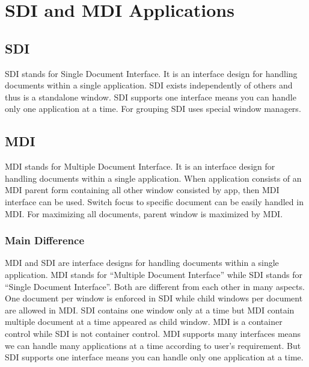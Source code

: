 \section{SDI and MDI Applications}

\subsection{SDI}
SDI stands for Single Document Interface. It is an interface design for handling documents within a
single application. SDI exists independently of others and thus is a standalone window. SDI
supports one interface means you can handle only one application at a time. For grouping SDI uses
special window managers.

\subsection{MDI}
MDI stands for Multiple Document Interface. It is an interface design for handling documents
within a single application. When application consists of an MDI parent form containing all other
window consisted by app, then MDI interface can be used. Switch focus to specific document can
be easily handled in MDI. For maximizing all documents, parent window is maximized by MDI.

\subsubsection*{Main Difference}
MDI and SDI are interface designs for handling documents within a single application. MDI stands
for “Multiple Document Interface” while SDI stands for “Single Document Interface”. Both are
different from each other in many aspects. One document per window is enforced in SDI while
child windows per document are allowed in MDI. SDI contains one window only at a time but MDI
contain multiple document at a time appeared as child window. MDI is a container control while
SDI is not container control. MDI supports many interfaces means we can handle many applications
at a time according to user’s requirement. But SDI supports one interface means you can handle
only one application at a time.

